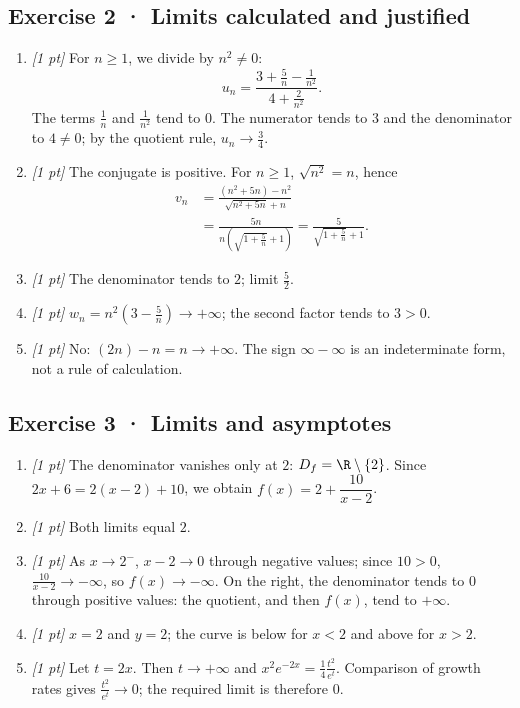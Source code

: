 \subsection*{Exercise 2 · Limits calculated and justified}\begin{enumerate}

\item \textit{[1 pt]} For $n\ge1$, we divide by $n^2\ne0$:
\[u_n=\frac{3+\frac{5}{n}-\frac{1}{n^2}}{4+\frac{2}{n^2}}.\]
The terms $\frac{1}{n}$ and $\frac{1}{n^2}$ tend to $0$. The numerator tends to $3$ and the denominator to $4\ne0$; by the quotient rule, $u_n\to\frac{3}{4}$.

\item \textit{[1 pt]} The conjugate is positive. For $n\ge1$, $\sqrt{n^2}=n$, hence
\[\begin{aligned}v_n&=\frac{(n^2+5n)-n^2}{\sqrt{n^2+5n}+n}\\&=\frac{5n}{n(\sqrt{1+\frac{5}{n}}+1)}=\frac{5}{\sqrt{1+\frac{5}{n}}+1}.\end{aligned}\]

\item \textit{[1 pt]} The denominator tends to $2$; limit $\frac{5}{2}$.

\item \textit{[1 pt]} $w_n=n^2(3-\frac{5}{n})\to+\infty$; the second factor tends to $3>0$.

\item \textit{[1 pt]} No: $(2n)-n=n\to+\infty$. The sign $\infty-\infty$ is an indeterminate form, not a rule of calculation.

\end{enumerate}

\subsection*{Exercise 3 · Limits and asymptotes}\begin{enumerate}

\item \textit{[1 pt]} The denominator vanishes only at $2$: $D_f=\R\setminus\{2\}$. Since $2x+6=2(x-2)+10$, we obtain $f(x)=2+\dfrac{10}{x-2}$.

\item \textit{[1 pt]} Both limits equal $2$.

\item \textit{[1 pt]} As $x\to 2^-$, $x-2\to0$ through negative values; since $10>0$, $\frac{10}{x-2}\to-\infty$, so $f(x)\to-\infty$. On the right, the denominator tends to $0$ through positive values: the quotient, and then $f(x)$, tend to $+\infty$.

\item \textit{[1 pt]} $x=2$ and $y=2$; the curve is below for $x<2$ and above for $x>2$.

\item \textit{[1 pt]} Let $t=2x$. Then $t\to+\infty$ and $x^2e^{-2x}=\frac{1}{4}\frac{t^2}{e^t}$. Comparison of growth rates gives $\frac{t^2}{e^t}\to0$; the required limit is therefore $0$.

\end{enumerate}

